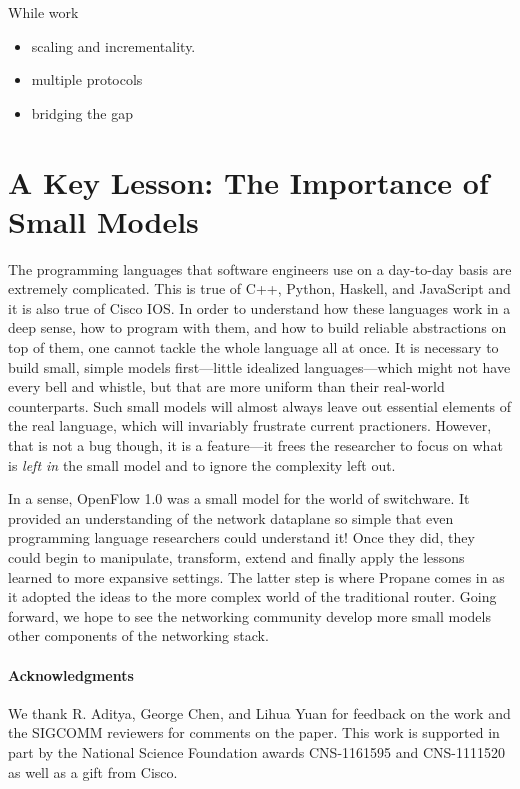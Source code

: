 \documentclass[10pt]{sigalternate052015}
\newcommand{\para}[1]{\paragraph*{\textbf{#1}}}
\begin{document}
While work 

\begin{itemize}
\item scaling and incrementality.
\item multiple protocols
\item bridging the gap
\end{itemize}

\section{A Key Lesson:  The Importance of Small Models}
\label{sec:conclusions}

The programming languages that software engineers use on a day-to-day
basis are extremely complicated.  This is true of C++, Python, Haskell, and
JavaScript and it is also true of Cisco IOS.  In order to understand
how these languages work in a deep sense, how to program with them,
and how to build reliable abstractions on top of them, one cannot
tackle the whole language all at once.  It is necessary to build
small, simple models first---little idealized languages---which might
not have every bell and whistle, but that are more uniform than their
real-world counterparts.  Such
small models will almost always leave out essential elements of the
real language, which will invariably frustrate current practioners.
However, that is
not a bug though, it is a feature---it frees the researcher to focus on
what is \emph{left in} the small model and to ignore the complexity left out.

In a sense, OpenFlow 1.0 was a small model for the world of
switchware.  It provided an understanding of the network dataplane so
simple that even programming language researchers could understand it!
Once they did, they could begin to manipulate, transform, extend and
finally apply the lessons learned to more expansive settings.  The
latter step is where Propane comes in as it adopted the ideas to the
more complex world of the traditional router.  Going forward, we hope
to see the networking community develop more small models other
components of the networking stack.

\para{Acknowledgments}
We thank R. Aditya, George Chen, and Lihua Yuan for feedback on the work and the SIGCOMM reviewers for comments on the paper. This work is supported in part by the National Science Foundation awards CNS-1161595 and CNS-1111520 as well as a gift from Cisco.


\balance




\end{document}
